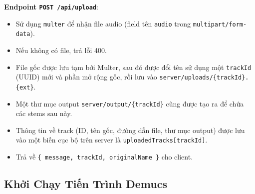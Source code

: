 \documentclass[12pt,a4paper]{article}
\begin{document}
\textbf{Endpoint \texttt{POST /api/upload}}:
\begin{itemize}
    \item Sử dụng \texttt{multer} để nhận file audio (field tên \texttt{audio} trong \texttt{multipart/form-data}).
    \item Nếu không có file, trả lỗi 400.
    \item File gốc được lưu tạm bởi Multer, sau đó được đổi tên sử dụng một \texttt{trackId} (UUID) mới và phần mở rộng gốc, rồi lưu vào \texttt{server/uploads/\{trackId\}.\{ext\}}.
    \item Một thư mục output \texttt{server/output/\{trackId\}} cũng được tạo ra để chứa các stems sau này.
    \item Thông tin về track (ID, tên gốc, đường dẫn file, thư mục output) được lưu vào một biến cục bộ trên server là \texttt{uploadedTracks[trackId]}.
    \item Trả về \texttt{\{ message, trackId, originalName \}} cho client.
\end{itemize}

\subsection{Khởi Chạy Tiến Trình Demucs}
\label{subsec:demucs-process}
\end{document}
